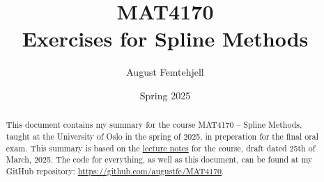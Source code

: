 \documentclass[
    a4paper,
    12pt,
]{article}
\title{
    MAT4170\\
    \small{Exercises for Spline Methods}
}
\author{August Femtehjell}
\date{Spring 2025}
\theoremstyle{breaktheorem}
\numberwithin{equation}{section}
\begin{document}
\maketitle

\tableofcontents

\begin{abstract}
    This document contains my summary for the course MAT4170 -- Spline Methods, taught at the University of Oslo in the spring of 2025, in preperation for the final oral exam. %
    This summary is based on the \href{https://www.uio.no/studier/emner/matnat/math/MAT4170/v25/undervisningsmateriale/spline_notes.pdf}{lecture notes} for the course, draft dated 25th of March, 2025.
    The code for everything, as well as this document, can be found at my GitHub repository: \url{https://github.com/augustfe/MAT4170}.
\end{abstract}






\end{document}
